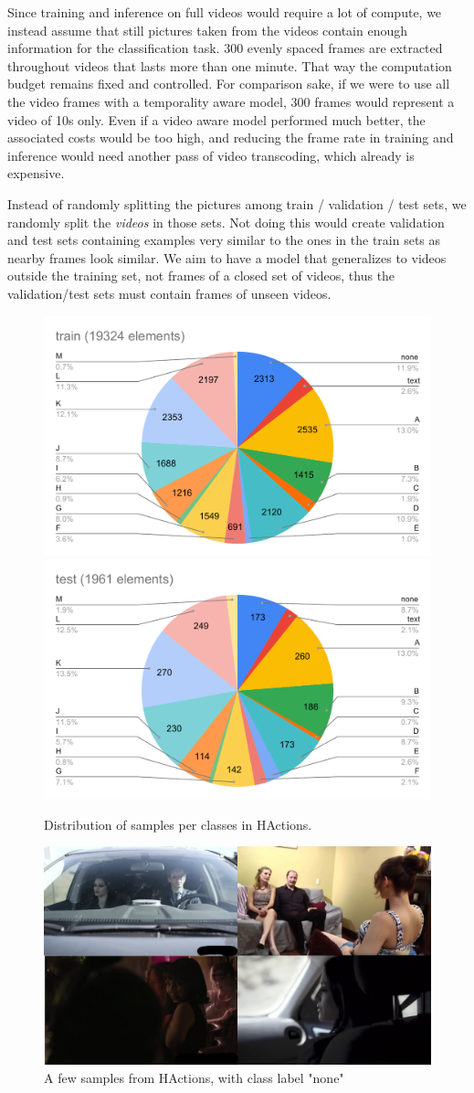 Since training and inference on full videos would require a lot of compute, we instead assume that still pictures taken from the videos contain enough information for the classification task. 300 evenly spaced frames are extracted throughout videos that lasts more than one minute. That way the computation budget remains fixed and controlled. For comparison sake, if we were to use all the video frames with a temporality aware model, 300 frames would represent a video of 10s only. Even if a video aware model performed much better, the associated costs would be too high, and reducing the frame rate in training and inference would need another pass of video transcoding, which already is expensive.

Instead of randomly splitting the pictures among train / validation / test sets, we randomly split the \emph{videos} in those sets. Not doing this would create validation and test sets containing examples very similar to the ones in the train sets as nearby frames look similar. We aim to have a model that generalizes to videos outside the training set, not frames of a closed set of videos, thus the validation/test sets must contain frames of unseen videos.

\begin{figure}
    \centering
    \includegraphics[width=0.45\columnwidth]{20-files/train.pdf}
    \includegraphics[width=0.45\columnwidth]{20-files/test.pdf}
    \caption{Distribution of samples per classes in HActions.}
    \label{fig:xactions}
\end{figure}

\begin{figure}
    \centering
    \includegraphics[width=0.7\columnwidth]{20-files/actions.jpg}
    \caption{A few samples from HActions, with class label "none"}
    \label{fig:xactionsamples}
\end{figure}


